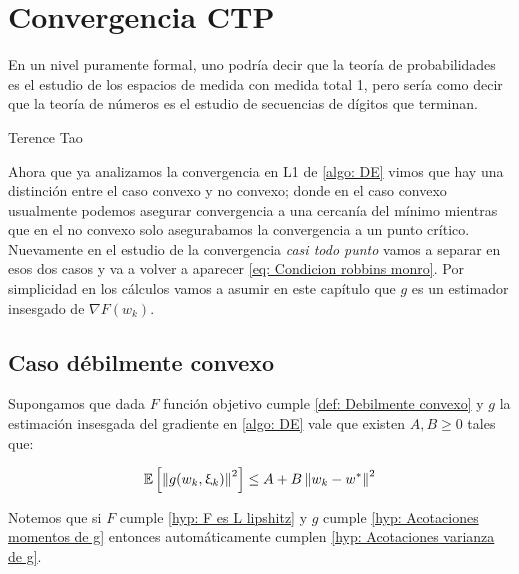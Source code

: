 \chapter{Convergencia CTP }\label{ch:convergenciaCTP}

\epigraph{En un nivel puramente formal, uno podr\'ia decir que la teor\'ia de probabilidades es el estudio de los espacios de medida con medida total 1, pero ser\'ia como decir que la teor\'ia de n\'umeros es el estudio de secuencias de d\'igitos que terminan.}{Terence Tao}

Ahora que ya analizamos la convergencia en L1 de \ref{algo: DE} vimos que hay una distinci\'on entre el caso convexo y no convexo; donde en el caso convexo usualmente podemos asegurar convergencia a una cercan\'ia del m\'inimo mientras que en el no convexo solo asegurabamos la convergencia a un punto cr\'itico. Nuevamente en el estudio de la convergencia \textit{casi todo punto} vamos a separar en esos dos casos y va a volver a aparecer \ref{eq: Condicion robbins monro}. Por simplicidad en los c\'alculos vamos a asumir en este cap\'itulo que $g$ es un estimador insesgado de $\nabla F(w_k)$.

\section{Caso d\'ebilmente convexo}

\begin{hyp}
	\label{hyp: Acotaciones varianza de g}
	Supongamos que dada $F$ funci\'on objetivo cumple \ref{def: Debilmente convexo} y $g$ la estimaci\'on insesgada del gradiente en \ref{algo: DE} vale que existen $A,B \geq 0$ tales que:
	
	\begin{equation*}
		\label{eq: Segundo momento acotado de g insesgado}
		\mathbb{E} \left[\left\lVert g(w_k, \upxi_{k})\right\rVert^2\right] \leq A + B \left\lVert w_k - w^*\right\rVert^2
	\end{equation*}
	
\end{hyp}

\begin{remark}
	Notemos que si $F$ cumple \ref{hyp: F es L lipshitz} y $g$ cumple \ref{hyp: Acotaciones momentos de g} entonces autom\'aticamente cumplen \ref{hyp: Acotaciones varianza de g}.
\end{remark}

